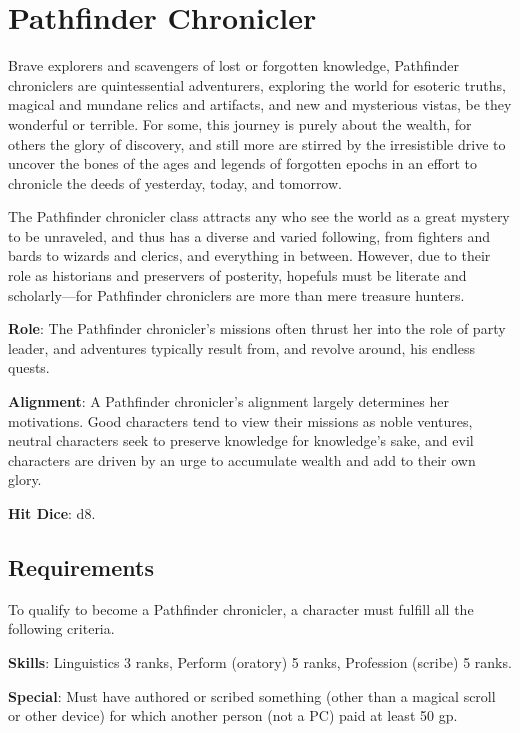 \section{Pathfinder Chronicler}

\label{f0}				
Brave explorers and scavengers of lost or forgotten knowledge, Pathfinder chroniclers are quintessential adventurers, exploring the world for esoteric truths, magical and mundane relics and artifacts, and new and mysterious vistas, be they wonderful or terrible. For some, this journey is purely about the wealth, for others the glory of discovery, and still more are stirred by the irresistible drive to uncover the bones of the ages and legends of forgotten epochs in an effort to chronicle the deeds of yesterday, today, and tomorrow.
				
The Pathfinder chronicler class attracts any who see the world as a great mystery to be unraveled, and thus has a diverse and varied following, from fighters and bards to wizards and clerics, and everything in between. However, due to their role as historians and preservers of posterity, hopefuls must be literate and scholarly---for Pathfinder chroniclers are more than mere treasure hunters.
				
\textbf{Role}: The Pathfinder chronicler's missions often thrust her into the role of party leader, and adventures typically result from, and revolve around, his endless quests. 
				
\textbf{Alignment}: A Pathfinder chronicler's alignment largely determines her motivations. Good characters tend to view their missions as noble ventures, neutral characters seek to preserve knowledge for knowledge's sake, and evil characters are driven by an urge to accumulate wealth and add to their own glory.
				
\textbf{Hit Dice}: d8.
				
\subsection{Requirements}

				
To qualify to become a Pathfinder chronicler, a character must fulfill all the following criteria.
				
\textbf{Skills}: Linguistics 3 ranks, Perform (oratory) 5 ranks, Profession (scribe) 5 ranks.
				
\textbf{Special}: Must have authored or scribed something (other than a magical scroll or other device) for which another person (not a PC) paid at least 50 gp.
				
